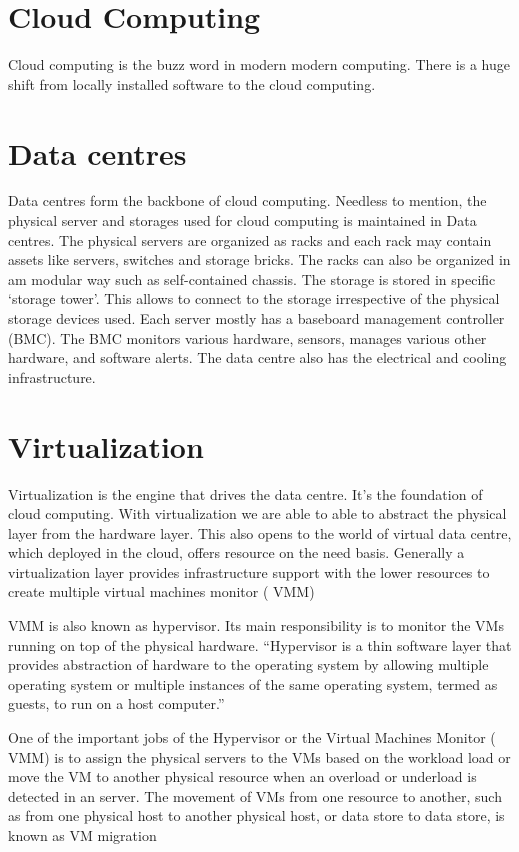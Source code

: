 \documentclass[a4paper,12pt]{Classes/RoboticsLaTeX}
\begin{document}
    \section{Cloud Computing} 
    Cloud computing is the buzz word in modern modern computing. There is a huge shift from locally installed software to the cloud computing. 

    \section{Data centres} 
    Data centres form the backbone of cloud computing. Needless to mention, the physical server and storages used for cloud computing is maintained in Data centres.\cite{kant2009data} The physical servers are organized as racks and each rack may contain assets like servers, switches and storage bricks. The racks can also be organized in am modular way such as self-contained chassis. The storage is stored in specific ‘storage tower’. This allows to connect to the storage irrespective of the physical storage devices used. Each server mostly has a baseboard management controller (BMC). The BMC monitors various hardware, sensors, manages various other hardware, and software alerts. The data centre also has the electrical and cooling infrastructure.

    \section{Virtualization } 
    Virtualization is the engine that drives the data centre. It’s the foundation of cloud computing. With virtualization we are able to able to abstract the physical layer from the hardware layer. This also opens to the world of virtual data centre, which deployed in the cloud, offers resource on the need basis. Generally a virtualization layer provides infrastructure support with the lower resources to create multiple virtual machines monitor ( VMM)\cite{chiueh2005survey}

    VMM is also known as hypervisor. Its main responsibility is to monitor the VMs running on top of the physical hardware. “Hypervisor is a thin software layer that provides abstraction of hardware to the operating system by allowing multiple operating system or multiple instances of the same operating system, termed as guests, to run on a host computer.”\cite{bauman2015survey}

    One of the important jobs of the Hypervisor or the Virtual Machines Monitor ( VMM) is to assign the physical servers to the VMs based on the workload load or move the VM to another physical resource when an overload or underload is detected in an server. The movement of VMs from one resource to another, such as from one physical host to another physical host, or data store to data store, is known as VM migration \cite{sturm2017application}
    
\end{document}

